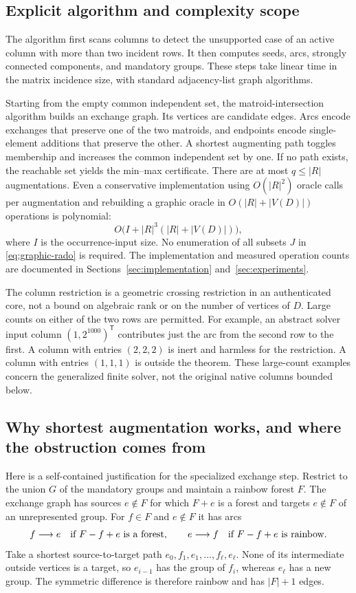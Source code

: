 \subsection{Explicit algorithm and complexity scope}
The algorithm first scans columns to detect the unsupported case of an
active column with more than two incident rows.  It then computes seeds,
arcs, strongly connected
components, and mandatory groups.  These steps take linear time in the
matrix incidence size, with standard adjacency-list graph algorithms.

Starting from the empty common independent set, the matroid-intersection
algorithm builds an exchange graph.  Its vertices are candidate edges.
Arcs encode exchanges that preserve one of the two matroids, and endpoints
encode single-element additions that preserve the other.  A shortest
augmenting path toggles membership and increases the common independent
set by one.  If no path exists, the reachable set yields the min--max
certificate.  There are at most $q\leq|R|$ augmentations.  Even a conservative
implementation using $O(|R|^2)$ oracle calls per augmentation and rebuilding
a graphic oracle in $O(|R|+|V(D)|)$ operations is polynomial:
\[
 O\bigl(I+|R|^3(|R|+|V(D)|)\bigr),
\]
where $I$ is the occurrence-input size.  No enumeration of all subsets $J$
in \eqref{eq:graphic-rado} is required.  The implementation and measured
operation counts are documented in Sections~\ref{sec:implementation}
and~\ref{sec:experiments}.

The column restriction is a geometric crossing restriction in an
authenticated core, not a bound on algebraic rank or on the number of
vertices of $D$.  Large counts on either of the two rows are permitted.
For example, an abstract solver input column $(1,2^{1000})^{\mathsf T}$
contributes just the arc
from the second row to the first.  A column with entries $(2,2,2)$ is
inert and harmless for the restriction.  A column with entries $(1,1,1)$
is outside the theorem.  These large-count examples concern the generalized
finite solver, not the original native columns bounded below.

\subsection{Why shortest augmentation works, and where the obstruction comes from}
Here is a self-contained justification for the specialized exchange step.
Restrict to the union $G$ of the mandatory groups and maintain a rainbow
forest $F$.  The exchange graph has sources $e\notin F$ for which $F+e$
is a forest and targets $e\notin F$ of an unrepresented group.  For
$f\in F$ and $e\notin F$ it has arcs
\[
 f\longrightarrow e\quad\hbox{if }F-f+e\hbox{ is a forest},\qquad
 e\longrightarrow f\quad\hbox{if }F-f+e\hbox{ is rainbow}.
\]
Take a shortest source-to-target path
$e_0,f_1,e_1,\ldots,f_\ell,e_\ell$.  None of its intermediate outside
vertices is a target, so $e_{i-1}$ has the group of $f_i$, whereas
$e_\ell$ has a new group.  The symmetric difference is therefore rainbow
and has $|F|+1$ edges.

